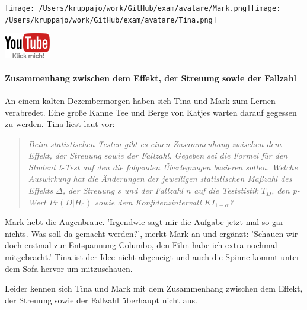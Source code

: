 \documentclass[a4paper, 9pt]{scrartcl}\usepackage[]{graphicx}\usepackage[]{xcolor}
\begin{document}
 
\begin{minipage}[t]{0.5\textwidth}
\texttt{[image: /Users/kruppajo/work/GitHub/exam/avatare/Mark.png]}\hspace{-4mm}\texttt{[image: /Users/kruppajo/work/GitHub/exam/avatare/Tina.png]}
\end{minipage}
\begin{minipage}[t]{0.5\textwidth}
\hfill
\href{https://youtu.be/FgZmpnEWDag}{\includegraphics[width = 2cm]{img/youtube}}
\end{minipage}



\paragraph{Zusammenhang zwischen dem Effekt, der Streuung sowie der Fallzahl}

An einem kalten Dezembermorgen haben sich Tina und Mark zum Lernen verabredet. Eine große Kanne Tee und Berge von Katjes warten darauf gegessen zu werden. Tina liest laut vor:\begin{quote}
                 \textit{
                 Beim statistischen Testen gibt es einen Zusammenhang zwischen dem Effekt, der Streuung sowie der Fallzahl. Gegeben sei die Formel für den Student t-Test auf den die folgenden Überlegungen basieren sollen. Welche Auswirkung hat die Änderungen der jeweiligen statistischen Maßzahl des Effekts $\Delta$, der Streuung $s$ und der Fallzahl $n$ auf die Teststistik $T_{D}$, den p-Wert $Pr(D|H_0)$ sowie dem Konfidenzintervall $KI_{1-\alpha}$?
                 }
                 \end{quote}Mark hebt die Augenbraue. 'Irgendwie sagt mir die Aufgabe jetzt mal so gar nichts. Was soll da gemacht werden?', merkt Mark an und ergänzt: 'Schauen wir doch erstmal zur Entspannung Columbo, den Film habe ich extra nochmal mitgebracht.' Tina ist der Idee nicht abgeneigt und auch die Spinne kommt unter dem Sofa hervor um mitzuschauen. 

\vspace{1ex}

Leider kennen sich Tina und Mark mit dem Zusammenhang zwischen dem Effekt, der Streuung sowie der Fallzahl überhaupt nicht aus. 
\end{document}
